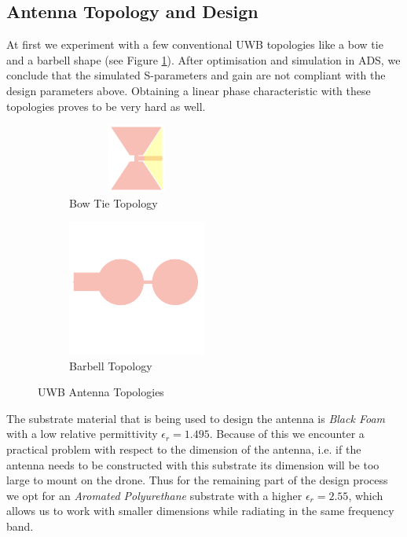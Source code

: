 \documentclass[a4paper]{article}        %
\begin{document}
	\subsection{Antenna Topology and Design}
	\label{subsec:ant_design}

	At first we experiment with a few conventional UWB topologies like a bow tie and a barbell shape (see Figure \ref{fig:topologies}). After optimisation and simulation in ADS, we conclude that the simulated S-parameters and gain are not compliant with the design parameters above. Obtaining a linear phase characteristic with these topologies proves to be very hard as well.  

		\begin{figure}[H]
		\begin{subfigure}{0.5\textwidth}
			\centering
			\includegraphics[width=0.5\textwidth,height=85px]{images/antenna/bow_tie.png}
			\caption{Bow Tie Topology}
		\end{subfigure}
		\begin{subfigure}{0.5\textwidth}
			\centering
			\includegraphics[width=0.5\textwidth]{images/antenna/bar_bell.png}
			\caption{Barbell Topology}
		\end{subfigure}
		\caption{UWB Antenna Topologies}
		\label{fig:topologies}
		\end{figure} 

	The substrate material that is being used to design the antenna is \textit{Black Foam} with a low relative permittivity $\epsilon_r = 1.495$. Because of this we encounter a practical problem with respect to the dimension of the antenna, i.e. if the antenna needs to be constructed with this substrate its dimension will be too large to mount on the drone. Thus for the remaining part of the design process we opt for an \textit{Aromated Polyurethane} substrate with a higher $\epsilon_r = 2.55$, which allows us to work with smaller dimensions while radiating in the same frequency band. 
\end{document}
